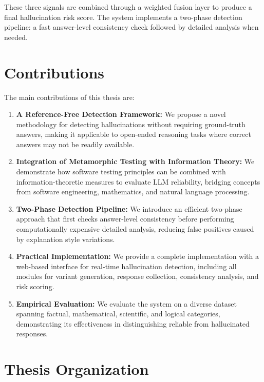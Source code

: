 These three signals are combined through a weighted fusion layer to produce a final hallucination risk score. The system implements a two-phase detection pipeline: a fast answer-level consistency check followed by detailed analysis when needed.

\section{Contributions}

The main contributions of this thesis are:

\begin{enumerate}
    \item \textbf{A Reference-Free Detection Framework:} We propose a novel methodology for detecting hallucinations without requiring ground-truth answers, making it applicable to open-ended reasoning tasks where correct answers may not be readily available.

    \item \textbf{Integration of Metamorphic Testing with Information Theory:} We demonstrate how software testing principles can be combined with information-theoretic measures to evaluate LLM reliability, bridging concepts from software engineering, mathematics, and natural language processing.

    \item \textbf{Two-Phase Detection Pipeline:} We introduce an efficient two-phase approach that first checks answer-level consistency before performing computationally expensive detailed analysis, reducing false positives caused by explanation style variations.

    \item \textbf{Practical Implementation:} We provide a complete implementation with a web-based interface for real-time hallucination detection, including all modules for variant generation, response collection, consistency analysis, and risk scoring.

    \item \textbf{Empirical Evaluation:} We evaluate the system on a diverse dataset spanning factual, mathematical, scientific, and logical categories, demonstrating its effectiveness in distinguishing reliable from hallucinated responses.
\end{enumerate}

\section{Thesis Organization}

